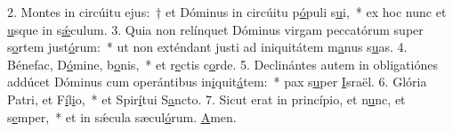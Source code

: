 2. Montes in circúitu ejus:~† et Dóminus in circúitu p\uline{ó}puli s\uline{u}i,~* ex hoc nunc et \uline{u}sque in s\uline{ǽ}culum.
3. Quia non relínquet Dóminus virgam peccatórum super s\uline{o}rtem just\uline{ó}rum:~* ut non exténdant justi ad iniquitátem m\uline{a}nus s\uline{u}as.
4. Bénefac, D\uline{ó}mine, b\uline{o}nis,~* et r\uline{e}ctis c\uline{o}rde.
5. Declinántes autem in obligatiónes addúcet Dóminus cum operántibus in\uline{i}quit\uline{á}tem:~* pax s\uline{u}per \uline{I}sraël.
6. Glória Patri, et F\uline{í}l\uline{i}o,~* et Spir\uline{í}tui S\uline{a}ncto.
7. Sicut erat in princípio, et n\uline{u}nc, et s\uline{e}mper,~* et in sǽcula sæcul\uline{ó}rum. \uline{A}men.
